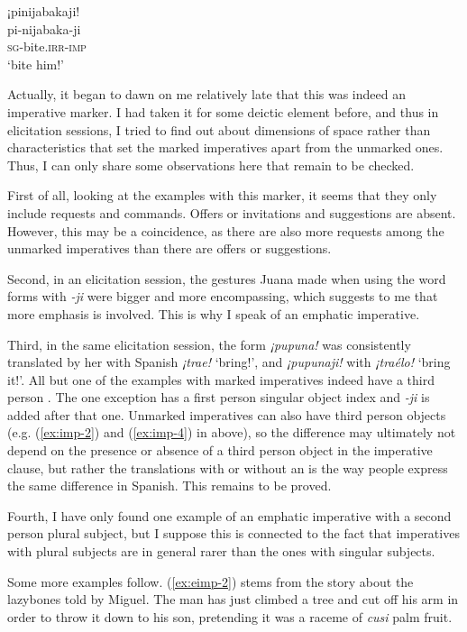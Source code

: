 \ea\label{ex:eimp-1}
\begingl
\glpreamble ¡pinijabakaji!\\
\gla pi-nijabaka-ji\\
\textsc{sg}-bite.\textsc{irr}-\textsc{imp}\\
\glft ‘bite him!’
\endgl
\trailingcitation{[jxx-e191021e-2]}
\xe

Actually, it began to dawn on me relatively late that this was indeed an imperative marker. I had taken it for some deictic element before, and thus in elicitation sessions, I tried to find out about dimensions of space rather than characteristics that set the marked imperatives apart from the unmarked ones. Thus, I can only share some observations here that remain to be checked.

First of all, looking at the examples with this marker, it seems that they only include requests and commands. Offers or invitations and suggestions are absent. However, this may be a coincidence, as there are also more requests among the unmarked imperatives than there are offers or suggestions.

Second, in an elicitation session, the gestures Juana made when using the word forms with \textit{-ji} were bigger and more encompassing, which suggests to me that more emphasis is involved. This is why I speak of an emphatic imperative.

Third, in the same elicitation session, the form \textit{¡pupuna!} was consistently translated by her with Spanish \textit{¡trae!} ‘bring!’, and \textit{¡pupunaji!} with \textit{¡traélo!} ‘bring it!’. All but one of the examples with marked imperatives indeed have a third person . The one exception has a first person singular object index and \textit{-ji} is added after that one. Unmarked imperatives can also have third person objects (e.g. (\ref{ex:imp-2}) and (\ref{ex:imp-4}) in  above), so the difference may ultimately not depend on the presence or absence of a third person object in the imperative clause, but rather the translations with or without an  is the way people express the same difference in Spanish. This remains to be proved.

Fourth, I have only found one example of an emphatic imperative with a second person plural subject, but I suppose this is connected to the fact that imperatives with plural subjects are in general rarer than the ones with singular subjects.

Some more examples follow. (\ref{ex:eimp-2}) stems from the story about the lazybones told by Miguel. The man has just climbed a tree and cut off his arm in order to throw it down to his son, pretending it was a raceme of \textit{cusi} palm fruit.

